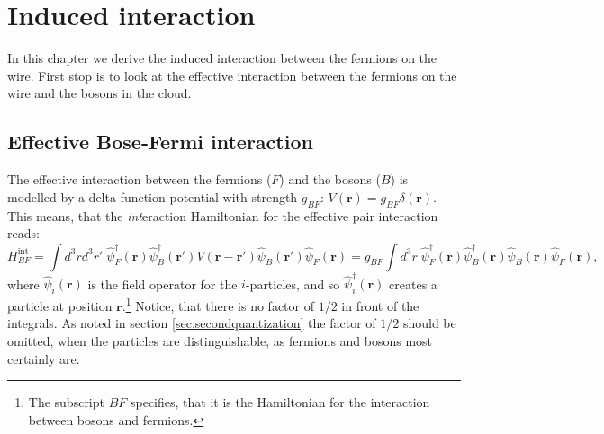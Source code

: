 
\chapter{Induced interaction} %

\label{Chapter3} %


In this chapter we derive the induced interaction between the fermions on the wire. First stop is to look at the effective interaction between the fermions on the wire and the bosons in the cloud.
\section{Effective Bose-Fermi interaction}
The effective interaction between the fermions ($F$) and the bosons ($B$) is modelled by a delta function potential with strength $g_{BF}$: $V(\mathbf{r})=g_{BF}\delta(\mathbf{r})$. This means, that the \textit{int}eraction Hamiltonian for the effective pair interaction reads:
\begin{equation}
H_{BF}^\text{int}  = \int d^3 r d^3 r' \; \hat{\psi}_F^\dagger(\mathbf{r}) \hat{\psi}_B^\dagger(\mathbf{r}')V(\mathbf{r}-\mathbf{r}')\hat{\psi}_B(\mathbf{r}')\hat{\psi}_F(\mathbf{r}) = g_{BF}\int d^3 r \; \hat{\psi}_F^\dagger(\mathbf{r}) \hat{\psi}_B^\dagger(\mathbf{r})\hat{\psi}_B(\mathbf{r})\hat{\psi}_F(\mathbf{r}),
\label{eq.HintBF}
\end{equation}
where $\hat{\psi}_i(\mathbf{r})$ is the field operator for the $i$-particles, and so $\hat{\psi}_i^\dagger(\mathbf{r})$ creates a particle at position $\mathbf{r}$.\footnote{The subscript $BF$ specifies, that it is the Hamiltonian for the interaction between bosons and fermions.} Notice, that there is no factor of $1/2$ in front of the integrals. As noted in section \ref{sec.secondquantization} the factor of $1/2$ should be omitted, when the particles are distinguishable, as fermions and bosons most certainly are. 

